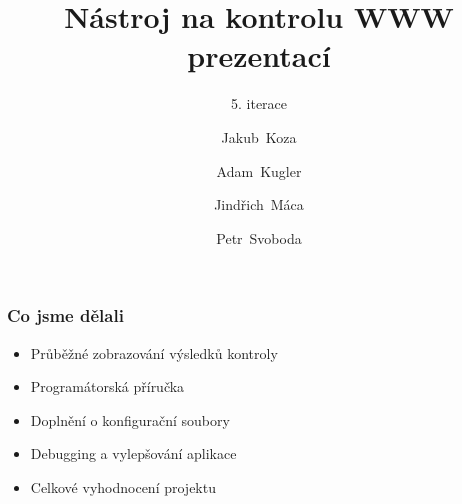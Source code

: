 \documentclass{beamer}
\begin{document}
\title [NKWP]{Nástroj na kontrolu WWW prezentací}
\author[J.~ Koza, A.~ Kugler, J.~Máca, P.~Svoboda]{Jakub~Koza \and Adam~Kugler \and Jindřich~Máca \and Petr~Svoboda}

\subtitle{5. iterace}
\frame{\titlepage}
\begin{frame}[allowframebreaks]\frametitle{Co jsme dělali}
   \begin{itemize}
    \item Průběžné zobrazování výsledků kontroly
		\item Programátorská příručka
		\item Doplnění o konfigurační soubory
		\item Debugging a vylepšování aplikace
		\item Celkové vyhodnocení projektu
   \end{itemize}
\end{frame}
\end{document}
